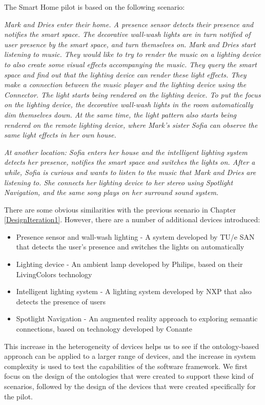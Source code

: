 The Smart Home pilot is based on the following scenario:

\textit{Mark and Dries enter their home. A presence sensor detects their presence and notifies the smart space. The decorative wall-wash lights are in turn notified of user presence by the smart space, and turn themselves on. Mark and Dries start listening to music. They would like to try to render the music on a lighting device to also create some visual effects accompanying the music. They query the smart space and find out that the lighting device can render these light effects. They make a connection between the music player and the lighting device using the Connector. The light starts being rendered on the lighting device. To put the focus on the lighting device, the decorative wall-wash lights in the room automatically dim themselves down. At the same time, the light pattern also starts being rendered on the remote lighting device, where Mark's sister Sofia can observe the same light effects in her own house.}

\textit{At another location: Sofia enters her house and the intelligent lighting system detects her presence, notifies the smart space and switches the lights on. After a while, Sofia is curious and wants to listen to the music that Mark and Dries are listening to. She connects her lighting device to her stereo using Spotlight Navigation, and the same song plays on her surround sound system.}

There are some obvious similarities with the previous scenario in Chapter \ref{DesignIteration1}. However, there are a number of additional devices introduced:

\begin{itemize}
	\item Presence sensor and wall-wash lighting - A system developed by TU/e \ac{SAN} that detects the user's presence and switches the lights on automatically
	\item Lighting device - An ambient lamp developed by Philips, based on their LivingColors technology
	\item Intelligent lighting system - A lighting system developed by NXP that also detects the presence of users
	\item Spotlight Navigation - An augmented reality approach to exploring semantic connections, based on technology developed by Conante
\end{itemize}

This increase in the heterogeneity of devices helps us to see if the ontology-based approach can be applied to a larger range of devices, and the increase in system complexity is used to test the capabilities of the software framework.
We first focus on the design of the ontologies that were created to support these kind of scenarios, followed by the design of the devices that were created specifically for the pilot.


